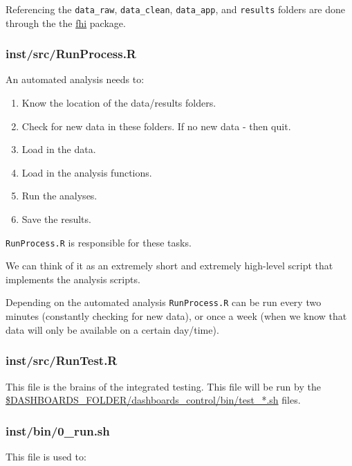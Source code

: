 \documentclass[12pt,]{article}
\providecommand{\tightlist}{%
  \setlength{\itemsep}{0pt}\setlength{\parskip}{0pt}}
\begin{document}
Referencing the \texttt{data\_raw}, \texttt{data\_clean},
\texttt{data\_app}, and \texttt{results} folders are done through the
the
\href{https://folkehelseinstituttet.github.io/fhi/articles/dashboardbasics.html}{fhi}
package.

\hypertarget{RunProcess}{\subsubsection{inst/src/RunProcess.R}\label{RunProcess}}

An automated analysis needs to:

\begin{enumerate}
\def\labelenumi{\arabic{enumi}.}
\tightlist
\item
  Know the location of the data/results folders.
\item
  Check for new data in these folders. If no new data - then quit.
\item
  Load in the data.
\item
  Load in the analysis functions.
\item
  Run the analyses.
\item
  Save the results.
\end{enumerate}

\texttt{RunProcess.R} is responsible for these tasks.

We can think of it as an extremely short and extremely high-level script
that implements the analysis scripts.

Depending on the automated analysis \texttt{RunProcess.R} can be run
every two minutes (constantly checking for new data), or once a week
(when we know that data will only be available on a certain day/time).

\subsubsection{inst/src/RunTest.R}\label{instsrcruntest.r}

This file is the brains of the integrated testing. This file will be run
by the
\protect\hyperlink{test_noispiah}{\$DASHBOARDS\_FOLDER/dashboards\_control/bin/test\_*.sh}
files.

\hypertarget{Runsh}{\subsubsection{inst/bin/0\_run.sh}\label{Runsh}}

This file is used to:
\end{document}
